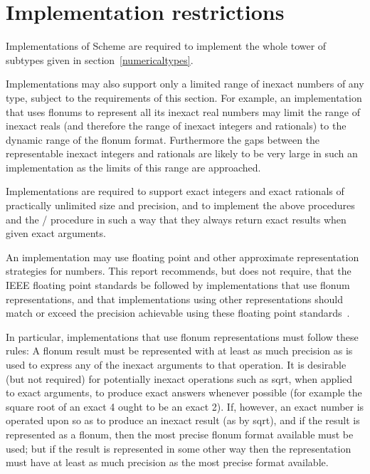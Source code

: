 \section{Implementation restrictions}

\label{restrictions}

\vest Implementations of Scheme are required to implement the whole
tower of subtypes given in section~\ref{numericaltypes}.

\vest Implementations may also support only a limited range of inexact numbers of
any type, subject to the requirements of this section.  For example,
an implementation that uses flonums to represent all its
inexact real numbers may
limit the range of inexact reals (and therefore
the range of inexact integers and rationals)
to the dynamic range of the flonum format.
Furthermore
the gaps between the representable inexact integers and
rationals are
likely to be very large in such an implementation as the limits of this
range are approached.

\vest Implementations are required to support
exact integers and exact rationals of
practically unlimited size and precision, and to implement the
above procedures and the {\cf /} procedure in
such a way that they always return exact results when given exact
arguments.

\vest An implementation may use floating point and other approximate 
representation strategies for  numbers.
This report recommends, but does not require, that the IEEE 
floating point standards be followed by implementations that use
flonum representations, and that implementations using
other representations should match or exceed the precision achievable
using these floating point standards~\cite{IEEE}.

\vest In particular, implementations that use flonum representations
must follow these rules: A flonum result
must be represented with at least as much precision as is used to express any of
the inexact arguments to that operation.  It is desirable (but not required) for
potentially inexact operations such as {\cf sqrt}, when applied to exact
arguments, to produce exact answers whenever possible (for example the
square root of an exact 4 ought to be an exact 2).
If, however, an
exact number is operated upon so as to produce an inexact result
(as by {\cf sqrt}), and if the result is represented as a flonum, then
the most precise flonum format available must be used; but if the result
is represented in some other way then the representation must have at least as
much precision as the most precise  format available.



